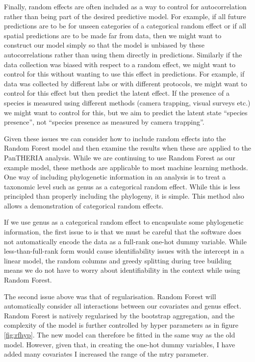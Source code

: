 \documentclass[10pt,]{article}
\begin{document}
Finally, random effects are often included as a way to control for autocorrelation rather than being part of the desired predictive model.
For example, if all future predictions are to be for unseen categories of a categorical random effect or if all spatial predictions are to be made far from data, then we might want to construct our model simply so that the model is unbiased by these autocorrelations rather than using them directly in predictions.
Similarly if the data collection was biased with respect to a random effect, we might want to control for this without wanting to use this effect in predictions.
For example, if data was collected by different labs or with different protocols, we might want to control for this effect but then predict the latent effect.
If the presence of a species is measured using different methods (camera trapping, visual surveys etc.) we might want to control for this, but we aim to predict the latent state ``species presence'', not ``species presence as measured by camera trapping''.

Given these issues we can consider how to include random effects into the Random Forest model and then examine the results when these are applied to the PanTHERIA analysis.
While we are continuing to use Random Forest as our example model, these methods are applicable to most machine learning methods.
One way of including phylogenetic information in an analysis is to treat a taxonomic level such as genus as a categorical random effect.
While this is less principled than properly including the phylogeny, it is simple.
This method also allows a demonstration of categorical random effects.

If we use genus as a categorical random effect to encapsulate some phylogenetic information, the first issue to is that we must be careful that the software does not automatically encode the data as a full-rank one-hot dummy variable.
While less-than-full-rank form would cause identifiability issues with the intercept in a linear model, the random columns and greedy splitting during tree building means we do not have to worry about identifiability in the context while using Random Forest.

The second issue above was that of regularisation.
Random Forest will automatically consider all interactions between our covariates and genus effect.
Random Forest is natively regularised by the bootstrap aggregation, and the complexity of the model is further controlled by hyper parameters as in figure \ref{fig:rfhyp}.
The new model can therefore be fitted in the same way as the old model.
However, given that, in creating the one-hot dummy variables, I have added many covariates I increased the range of the mtry parameter.
\end{document}
